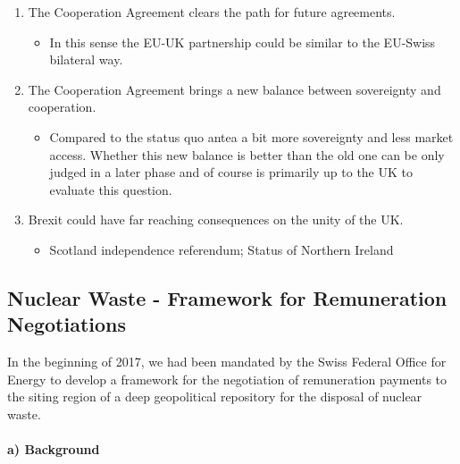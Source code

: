 \begin{enumerate}[1)]
    \item The Cooperation Agreement clears the path for future agreements.
        \begin{itemize}
            \item In this sense the EU-UK partnership could be similar to the
                EU-Swiss bilateral way.
        \end{itemize}
    \item The Cooperation Agreement brings a new balance between sovereignty and
        cooperation.
        \begin{itemize}
            \item Compared to the status quo antea a bit more sovereignty and
                less market access. Whether this new balance is better than the
                old one can be only judged in a later phase and of course is
                primarily up to the UK to evaluate this question.
        \end{itemize}
    \item Brexit could have far reaching consequences on the unity of the UK.
        \begin{itemize}
            \item Scotland independence referendum; Status of Northern Ireland
        \end{itemize}
\end{enumerate}


\subsection{Nuclear Waste - Framework for Remuneration Negotiations}

In the beginning of 2017, we had been mandated by the Swiss Federal Office
for Energy to develop a framework for the negotiation of remuneration
payments to the siting region of a deep geopolitical repository for the
disposal of nuclear waste.

\paragraph{a) Background}

